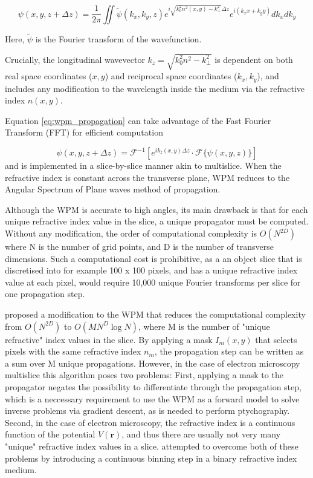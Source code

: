 \documentclass{article}
\begin{document}
\begin{equation}
\label{eq:wpm_propagation}
\psi(x,y, z+\Delta z) = \frac{1}{2\pi} \iint \tilde{\psi}(k_x, k_y, z) e^{i \sqrt{k_0^2 n^2(x,y) - k_\perp^2} \Delta z} e^{i(k_x x + k_y y)} dk_x dk_y
\end{equation}

Here, $\tilde{\psi}$ is the Fourier transform of the wavefunction. 

Crucially, the longitudinal wavevector $k_z = \sqrt{k_0^2 n^2 - k_\perp^2}$ 
is dependent on both real space coordinates ($x,y$) and reciprocal space coordinates ($k_x, k_y$), and includes any modification to the wavelength 
inside the medium via the refractive index $n(x,y)$.

Equation \eqref{eq:wpm_propagation} can take advantage of the Fast Fourier Transform (FFT) for efficient computation

\begin{equation}
\psi(x,y, z+\Delta z) = \mathcal{F}^{-1} \left[ e^{i k_z(x,y) \Delta z} \cdot \mathcal{F} \{ \psi(x,y,z) \} \right]
\end{equation} and is implemented in a slice-by-slice manner akin to multislice. When the refractive index is constant across the transverse plane, WPM reduces to the Angular Spectrum of Plane waves method 
of propagation.

Although the WPM is accurate to high angles, its main drawback is that for each unique refractive index value in the slice, a unique propagator must be computed. Without any modification, 
the order of computational complexity is $O(N^{2D})$ where N is the number of grid points, and D is the number of transverse dimensions. Such a computational cost is prohibitive, as a 
an object slice that is discretised into for example 100 x 100 pixels, and has a unique refractive index value at each pixel, would require 10,000 unique Fourier transforms per slice for one propagation step.

\cite{Schmidt} proposed a modification to the WPM that reduces the computational complexity from $O(N^{2D})$ to $O(M N^D \log N)$, where M is the number of "unique refractive" index values in the slice. 
By applying a mask $I_m(x,y)$ that selects pixels with the same refractive index $n_m$, the propagation step can be written as a sum over M unique propagations. However, in the case of electron microscopy multislice
this algorithm poses two problems: First, applying a mask to the propagator negates the possibility to differentiate through the propagation step, which is a neccessary requirement to use the WPM as a forward model 
to solve inverse problems via gradient descent, as is needed to perform ptychography. Second, in the case of electron microscopy, the refractive index is a  continuous function of the potential $V(\mathbf{r})$, and thus
there are usually not very many "unique" refractive index values in a slice. \cite{2025paper which creates a differential WPM} attempted to overcome both of these problems by introducing a 
continuous binning step in a binary refractive index medium. 
\end{document}
